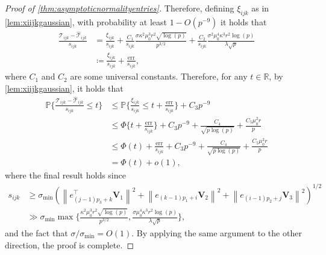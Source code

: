 \documentclass[10pt]{article}
\newcommand{\0}{{\mathbf{0}}}
\newcommand{\1}{{\mathbf{1}}}
\newcommand{\p}{\mathbb{P}}
\renewcommand{\hat}{\widehat}
\renewcommand{\hat}{\widehat}
\begin{document}
\begin{proof}[Proof of \cref{thm:asymptoticnormalityentries}]
Therefore, defining $\xi_{ijk}$ as in \cref{lem:xiijkgaussian}, with probability at least $1 - O(p^{-9})$ it holds that
\begin{align*}
\frac{\mathcal{T}_{ijk} - \mathcal{\hat T}_{ijk}}{s_{ijk}} &= \frac{\xi_{ijk}}{s_{ijk}} + \frac{C_1}{s_{ijk}} \frac{\sigma \kappa^2 \mu_0^3 r^2 \sqrt{ \log(p)}}{p^{3/2}} + \frac{C_2}{s_{ijk}}   \frac{\sigma^2 \mu_0^4 \kappa^3 r^{2} \log(p)}{\lambda \sqrt{p}} 
\\
&\coloneqq \frac{\xi_{ijk}}{s_{ijk}} + \frac{\mathrm{err}}{s_{ijk}}
,\end{align*}
where $C_1$ and $C_2$ are some universal constants.  Therefore,  for any $t \in \mathbb{R}$, by \cref{lem:xiijkgaussian}, it holds that
\begin{align*}
    \p\Bigg\{ \frac{\mathcal{T}_{ijk} - \mathcal{\hat T}_{ijk}}{s_{ijk}} \leq t \Bigg\} &\leq \p\Bigg\{\frac{\xi_{ijk}}{s_{ijk}} \leq t + \frac{\mathrm{err}}{s_{ijk}} \Bigg\}  + C_3 p^{-9} \\
    &\leq \Phi\Bigg\{ t + \frac{\mathrm{err}}{s_{ijk}} \Bigg\}+ C_3 p^{-9} + \frac{C_4}{\sqrt{p\log(p)}} + \frac{C_5 \mu_0^2 r}{p} \\
    &\leq \Phi(t) + \frac{\mathrm{err}}{s_{ijk}} + C_3 p^{-9} + \frac{C_4}{\sqrt{p\log(p)}} + \frac{C_5 \mu_0^2 r}{p} \\
    &= \Phi(t) + o(1),
\end{align*}
where the final result holds since
\begin{align*}
    s_{ijk} &\geq \sigma_{\min} \left(\left\|e_{(j-1) p_{3}+k}^{\top} \mathbf{V}_{1}\right\|^{2}+\left\|e_{(k-1) p_{1}+i} \mathbf{V}_{2}\right\|^{2}+\left\|e_{(i-1) p_{2}+j} \mathbf{V}_{3}\right\|^{2}\right)^{1 / 2} \\
    &\gg \sigma_{\min} \max\bigg\{ \frac{\kappa^2 \mu_0^3 r^2 \sqrt{\log(p)}}{p^{3/2}}, \frac{\sigma \mu_0^4 \kappa^3 r^2 \log(p)}{\lambda \sqrt{p}} \bigg\}, %
\end{align*}
and the fact that $\sigma/\sigma_{\min} = O(1)$.  By applying the same argument to the other direction, the proof is complete.
\end{proof}

\end{document}
